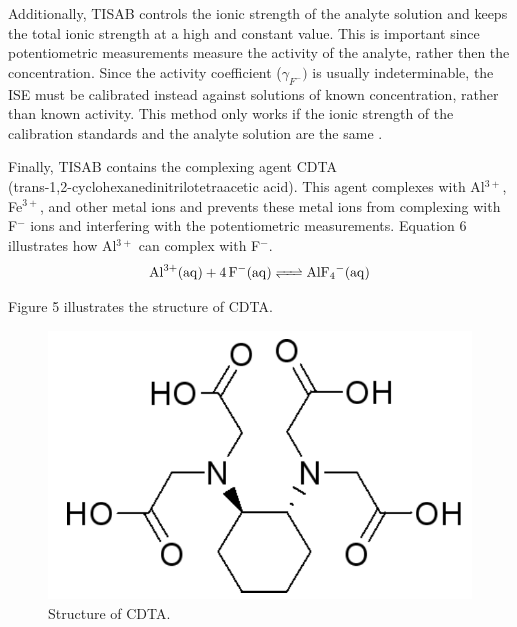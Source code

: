 \documentclass[journal=jacsat,manuscript=article,layout=twocolumn]{achemso}
\begin{document}
Additionally, TISAB controls the ionic strength of the analyte solution and
keeps the total ionic strength at a high and constant value.
This is important since potentiometric measurements measure the activity of the
analyte, rather then the concentration. Since the activity coefficient
($\gamma_{F^-})$ is usually indeterminable, the ISE must be calibrated instead
against solutions of known concentration, rather than known activity. This
method only works if the ionic strength of the calibration standards and the
analyte solution are the same \cite{nmt}.

Finally, TISAB contains the complexing agent CDTA \\
(trans-1,2-cyclohexanedinitrilotetraacetic acid). This agent complexes with
Al$^{3+}$, Fe$^{3+}$, and other metal ions and prevents these metal ions from complexing with
F$^-$ ions and interfering with the potentiometric measurements. Equation 6
illustrates how Al$^{3+}$ can complex with F$^-$.
\begin{equation}
    \ce {Al^{3+}(aq) + 4F-(aq) <=> AlF4-(aq)}
\end{equation}

Figure 5 illustrates the structure of CDTA.
\begin{figure}
    \includegraphics[scale=0.5]{cdta}
    \caption{Structure of CDTA.}
\end{figure}
\end{document}
